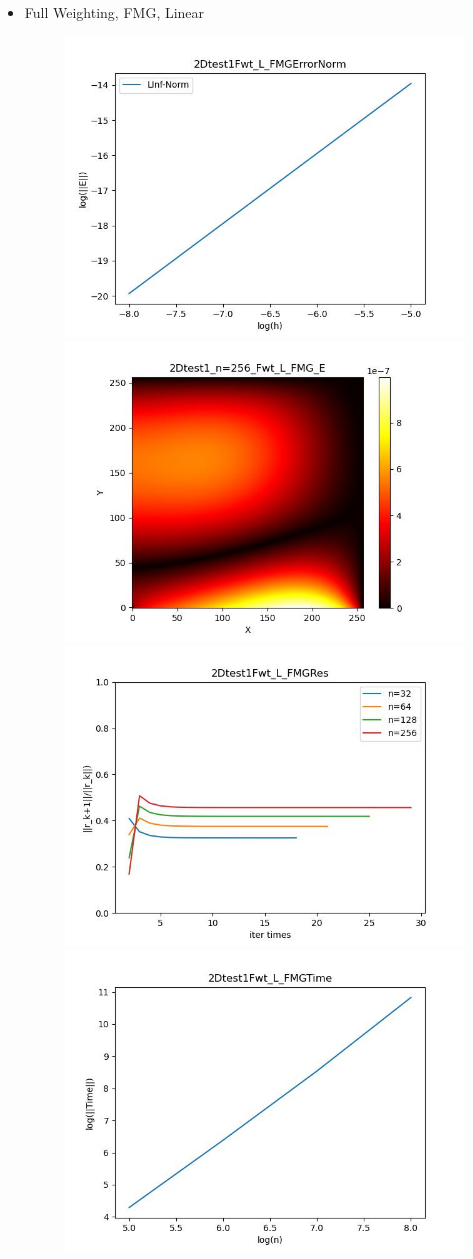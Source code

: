 \documentclass{article}
\begin{document}
\begin{itemize}
    \item Full Weighting, FMG, Linear
    \begin{figure}[h]
        \centering
        \includegraphics[width=0.35\linewidth]{2Dtest1Fwt_L_FMGErrorNorm.jpg}
        \includegraphics[width=0.35\linewidth]{2Dtest1_n=256_Fwt_L_FMG_E.jpg}
        \includegraphics[width=0.35\linewidth]{2Dtest1Fwt_L_FMGRes.jpg}
        \includegraphics[width=0.35\linewidth]{2Dtest1Fwt_L_FMGTime.jpg}
    \end{figure}
    

\end{itemize}
\end{document}
